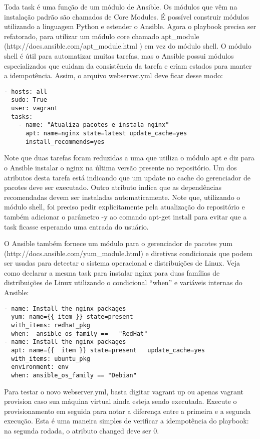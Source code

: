 Toda task é uma função de um módulo de Ansible. 
Os módulos que vêm na instalação padrão são chamados de 
Core Modules. É possível construir módulos utilizando a 
linguagem Python e estender o Ansible. Agora o playbook 
precisa ser refatorado, para utilizar um módulo core chamado 
apt\_module (http://docs.ansible.com/apt\_module.html ) 
em vez do módulo shell. O módulo shell é útil para 
automatizar muitas tarefas, mas o Ansible possui módulos 
especializados que cuidam da consistência da tarefa e 
criam estados para manter a idempotência. Assim, o 
arquivo webserver.yml deve ficar desse modo:
\begin{lstlisting}
- hosts: all
  sudo: True
  user: vagrant
  tasks:
    - name: "Atualiza pacotes e instala nginx"
      apt: name=nginx state=latest update_cache=yes
      install_recommends=yes
\end{lstlisting}
Note que duas tarefas foram reduzidas a uma que utiliza 
o módulo apt e diz para o Ansible instalar o nginx na 
última versão presente no repositório. Um dos atributos 
desta tarefa está indicando que um update no cache do 
gerenciador de pacotes deve ser executado. Outro atributo 
indica que as dependências recomendadas devem ser instaladas 
automaticamente. Note que, utilizando o módulo shell, foi 
preciso pedir explicitamente pela atualização do 
repositório e também adicionar o parâmetro -y ao comando 
apt-get install para evitar que a task ficasse esperando 
uma entrada do usuário.

O Ansible também fornece um módulo para o gerenciador 
de pacotes yum (http://docs.ansible.com/yum\_module.html) 
e diretivas condicionais que podem ser usadas para 
detectar o sistema operacional e distribuições de Linux. 
Veja como declarar a mesma task para instalar nginx para 
duas famílias de distribuições de Linux utilizando 
o condicional “when” e variáveis internas do Ansible:
\begin{lstlisting}
- name: Install	the nginx packages
  yum: name={{ item }} state=present
  with_items: redhat_pkg
  when:	 ansible_os_family ==	"RedHat"
- name: Install	the nginx packages
  apt: name={{	item }} state=present	update_cache=yes
  with_items: ubuntu_pkg
  environment: env
  when: ansible_os_family == "Debian"
\end{lstlisting}
Para testar o novo webserver.yml, basta digitar vagrant up ou 
apenas vagrant provision caso sua máquina virtual ainda esteja 
sendo executada. Execute o provisionamento em seguida para 
notar a diferença entre a primeira e a segunda execução. 
Esta é uma maneira simples de verificar a idempotência 
do playbook: na segunda rodada, o atributo changed deve ser 0.




